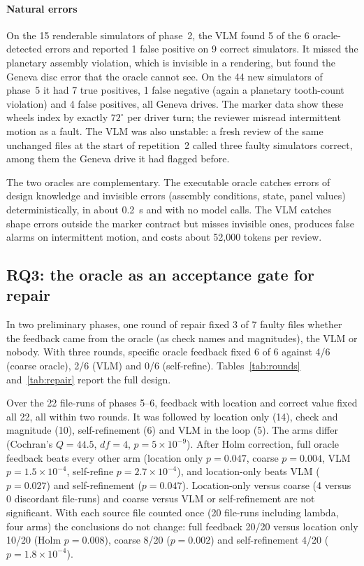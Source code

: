 \paragraph{Natural errors} On the 15 renderable simulators of phase~2, the VLM found 5 of the 6 oracle-detected errors and reported 1 false positive on 9 correct simulators. It missed the planetary assembly violation, which is invisible in a rendering, but found the Geneva disc error that the oracle cannot see. On the 44 new simulators of phase~5 it had 7 true positives, 1 false negative (again a planetary tooth-count violation) and 4 false positives, all Geneva drives. The marker data show these wheels index by exactly $72^\circ$ per driver turn; the reviewer misread intermittent motion as a fault. The VLM was also unstable: a fresh review of the same unchanged files at the start of repetition~2 called three faulty simulators correct, among them the Geneva drive it had flagged before.

The two oracles are complementary. The executable oracle catches errors of design knowledge and invisible errors (assembly conditions, state, panel values) deterministically, in about 0.2~s and with no model calls. The VLM catches shape errors outside the marker contract but misses invisible ones, produces false alarms on intermittent motion, and costs about 52{,}000 tokens per review.

\subsection{RQ3: the oracle as an acceptance gate for repair}\label{sec:rq3}

In two preliminary phases, one round of repair fixed 3 of 7 faulty files whether the feedback came from the oracle (as check names and magnitudes), the VLM or nobody. With three rounds, specific oracle feedback fixed 6 of 6 against 4/6 (coarse oracle), 2/6 (VLM) and 0/6 (self-refine). Tables~\ref{tab:rounds} and~\ref{tab:repair} report the full design.




Over the 22 file-runs of phases 5--6, feedback with location and correct value fixed all 22, all within two rounds. It was followed by location only (14), check and magnitude (10), self-refinement (6) and VLM in the loop (5). The arms differ (Cochran's $Q=44.5$, $df=4$, $p=5\times10^{-9}$). After Holm correction, full oracle feedback beats every other arm (location only $p=0.047$, coarse $p=0.004$, VLM $p=1.5\times10^{-4}$, self-refine $p=2.7\times10^{-4}$), and location-only beats VLM ($p=0.027$) and self-refinement ($p=0.047$). Location-only versus coarse (4 versus 0 discordant file-runs) and coarse versus VLM or self-refinement are not significant. With each source file counted once (20 file-runs including lambda, four arms) the conclusions do not change: full feedback 20/20 versus location only 10/20 (Holm $p=0.008$), coarse 8/20 ($p=0.002$) and self-refinement 4/20 ($p=1.8\times10^{-4}$).

